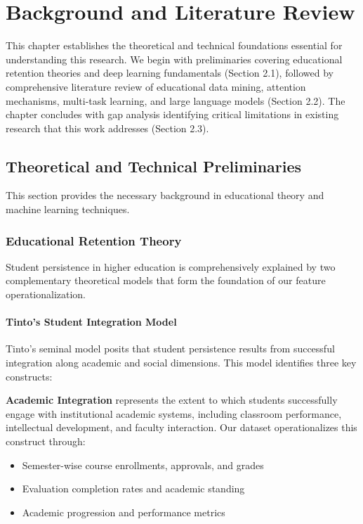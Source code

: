 \chapter{Background and Literature Review}

This chapter establishes the theoretical and technical foundations essential for understanding this research. We begin with preliminaries covering educational retention theories and deep learning fundamentals (Section 2.1), followed by comprehensive literature review of educational data mining, attention mechanisms, multi-task learning, and large language models (Section 2.2). The chapter concludes with gap analysis identifying critical limitations in existing research that this work addresses (Section 2.3).

\section{Theoretical and Technical Preliminaries}

This section provides the necessary background in educational theory and machine learning techniques.

\subsection{Educational Retention Theory}

Student persistence in higher education is comprehensively explained by two complementary theoretical models that form the foundation of our feature operationalization.

\subsubsection{Tinto's Student Integration Model}

Tinto's seminal model \cite{Tinto1993} posits that student persistence results from successful integration along academic and social dimensions. This model identifies three key constructs:

\textbf{Academic Integration} represents the extent to which students successfully engage with institutional academic systems, including classroom performance, intellectual development, and faculty interaction. Our dataset operationalizes this construct through:
\begin{itemize}
\item Semester-wise course enrollments, approvals, and grades
\item Evaluation completion rates and academic standing
\item Academic progression and performance metrics
\end{itemize}

